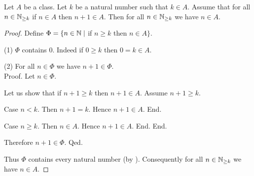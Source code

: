 \documentclass[10pt]{article}
\begin{document}
  \begin{forthel}
    \begin{theorem}[id=ARITHMETIC_04_4976599269113856,printid]
      Let $A$ be a class.
      Let $k$ be a natural number such that $k \in A$.
      Assume that for all $n \in \mathbb{N}_{\geq k}$ if $n \in A$ then $n + 1 \in A$.
      Then for all $n \in \mathbb{N}_{\geq k}$ we have $n \in A$.
    \end{theorem}
    \begin{proof}
      Define $\Phi = \{n \in \mathbb{N} \mid$ if $n \geq k$ then $n \in A \}$.

      (1) $\Phi$ contains $0$.
      Indeed if $0 \geq k$ then $0 = k \in A$.

      (2) For all $n \in \Phi$ we have $n + 1 \in \Phi$. \\
      Proof.
        Let $n \in \Phi$.

        Let us show that if $n + 1 \geq k$ then $n + 1 \in A$.
          Assume $n + 1 \geq k$.

          Case $n < k$.
            Then $n + 1 = k$.
            Hence $n + 1 \in A$.
          End.

          Case $n \geq k$.
            Then $n \in A$.
            Hence $n + 1 \in A$.
          End.
        End.

        Therefore $n + 1 \in \Phi$.
      Qed.

      Thus $\Phi$ contains every natural number (by ).
      Consequently for all $n \in \mathbb{N}_{\geq k}$ we have $n \in A$.
    \end{proof}
  \end{forthel}
\end{document}
